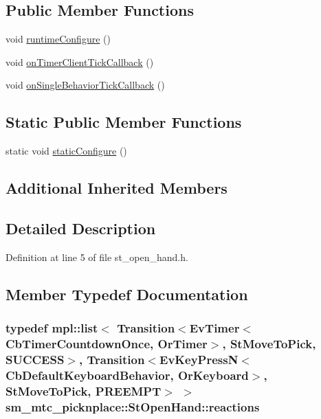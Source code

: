 \subsection*{Public Member Functions}
\begin{DoxyCompactItemize}
\item 
void \hyperlink{structsm__mtc__picknplace_1_1StOpenHand_a4e22aa1aadd1053e9caadc7b15be5d59}{runtime\+Configure} ()
\item 
void \hyperlink{structsm__mtc__picknplace_1_1StOpenHand_ab32a84aed1f36ee3faf8b7c97fd53420}{on\+Timer\+Client\+Tick\+Callback} ()
\item 
void \hyperlink{structsm__mtc__picknplace_1_1StOpenHand_a3b030b7c0c0c555e181662ac96cb4580}{on\+Single\+Behavior\+Tick\+Callback} ()
\end{DoxyCompactItemize}
\subsection*{Static Public Member Functions}
\begin{DoxyCompactItemize}
\item 
static void \hyperlink{structsm__mtc__picknplace_1_1StOpenHand_a2418b544d40993828c9c5571dfcd0c01}{static\+Configure} ()
\end{DoxyCompactItemize}
\subsection*{Additional Inherited Members}


\subsection{Detailed Description}


Definition at line 5 of file st\+\_\+open\+\_\+hand.\+h.



\subsection{Member Typedef Documentation}
\subsubsection[{\texorpdfstring{reactions}{reactions}}]{\setlength{\rightskip}{0pt plus 5cm}typedef mpl\+::list$<$ Transition$<$Ev\+Timer$<$Cb\+Timer\+Countdown\+Once, {\bf Or\+Timer}$>$, {\bf St\+Move\+To\+Pick}, {\bf S\+U\+C\+C\+E\+SS}$>$, Transition$<$Ev\+Key\+PressN$<$Cb\+Default\+Keyboard\+Behavior, {\bf Or\+Keyboard}$>$, {\bf St\+Move\+To\+Pick}, {\bf P\+R\+E\+E\+M\+PT}$>$ $>$ {\bf sm\+\_\+mtc\+\_\+picknplace\+::\+St\+Open\+Hand\+::reactions}}\hypertarget{structsm__mtc__picknplace_1_1StOpenHand_a8dc2ce7560eb60846fa7447a30f222ba}{}\label{structsm__mtc__picknplace_1_1StOpenHand_a8dc2ce7560eb60846fa7447a30f222ba}


